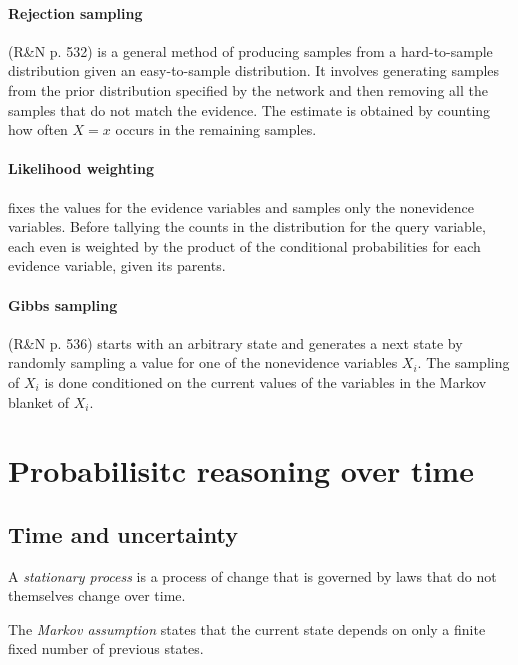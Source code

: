 \documentclass{article}
\begin{document}
\paragraph{Rejection sampling} (R\&N p. 532) is a general method of producing samples from a hard-to-sample
distribution given an easy-to-sample distribution. It involves generating samples from the
prior distribution specified by the network and then removing all the samples that do not
match the evidence. The estimate is obtained by counting how often $X=x$ occurs in the remaining
samples.

\paragraph{Likelihood weighting} fixes the values for the evidence variables and samples
only the nonevidence variables. Before tallying the counts in the distribution for the query
variable, each even is weighted by the product of the conditional probabilities for each evidence 
variable, given its parents.

\paragraph{Gibbs sampling} (R\&N p. 536) starts with an arbitrary state and generates a next state by randomly
sampling a value for one of the nonevidence variables $X_i$. The sampling of $X_i$ is done
conditioned on the current values of the variables in the Markov blanket of $X_i$.

\section{Probabilisitc reasoning over time}

\subsection{Time and uncertainty}

\begin{definition}[R\&N p. 568]
    A \emph{stationary process} is a process of change that is governed by laws
    that do not themselves change over time.
\end{definition}

\begin{definition}
    The \emph{Markov assumption} states that the current
    state depends on only a finite fixed number of previous states.
\end{definition}
\end{document}

